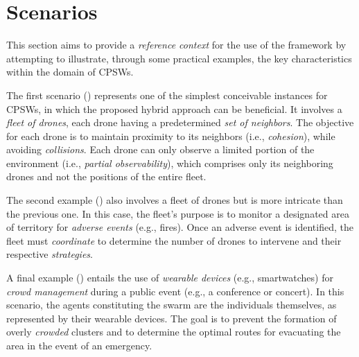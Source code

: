 \documentclass[12pt,a4paper,openright,twoside]{book}
\begin{document}
\section{Scenarios}
This section aims to provide a \emph{reference context} for the use of the framework by attempting to illustrate, 
    through some practical examples, the key characteristics within the domain of CPSWs.

The first scenario () represents one of the simplest conceivable instances for CPSWs, in which the proposed hybrid 
    approach can be beneficial. It involves a \emph{fleet of drones}, each drone having a predetermined \emph{set of neighbors}. 
    The objective for each drone is to maintain proximity to its neighbors (i.e., \emph{cohesion}), while avoiding \emph{collisions}.
    Each drone can only observe a limited portion of the environment (i.e., \emph{partial observability}), which comprises only its 
    neighboring drones and not the positions of the entire fleet.

    The second example () also involves a fleet of drones but is more intricate than the previous one. In this case, 
    the fleet's purpose is to monitor a designated area of territory for \emph{adverse events} (e.g., fires). Once an adverse 
    event is identified, the fleet must \emph{coordinate} to determine the number of drones to intervene and their 
    respective \emph{strategies}.

A final example () entails the use of \emph{wearable devices} (e.g., smartwatches) for \emph{crowd management} during a public event 
    (e.g., a conference or concert).
    In this scenario, the agents constituting the swarm are the individuals themselves, as represented by their wearable devices. 
    The goal is to prevent the formation of overly \emph{crowded} clusters and to determine the optimal routes 
    for evacuating the area in the event of an emergency.
\end{document}

